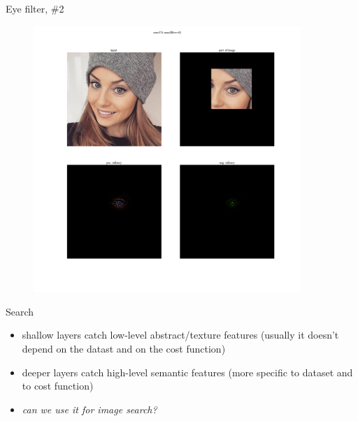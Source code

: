 \documentclass{beamer}
\begin{document}
\begin{frame}{Eye filter, \#2}

\begin{figure}[h!]
  \centering
  \includegraphics[width=0.9\textwidth]{images/eye2.png}
\end{figure}

\end{frame}


\begin{frame}{Search}

\begin{itemize}
\item shallow layers catch low-level abstract/texture features (usually it doesn't depend on the datast and on the cost function)
\item deeper layers catch high-level semantic features (more specific to dataset and to cost function)
\item \textit{can we use it for image search?}
\end{itemize}

\end{frame}
\end{document}
